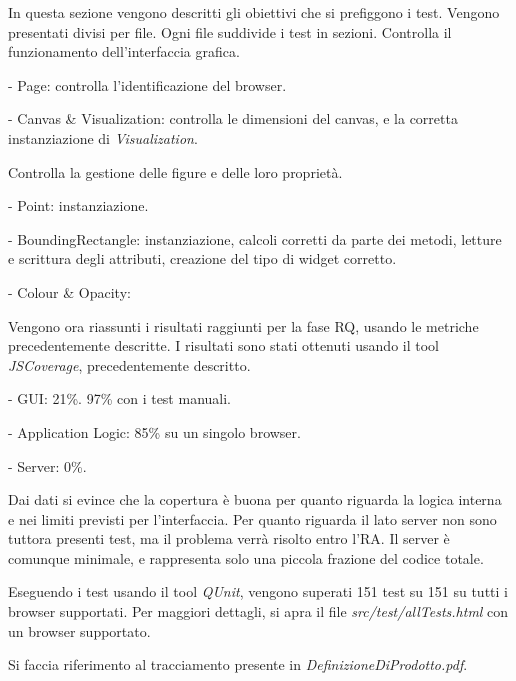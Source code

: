 In questa sezione vengono descritti gli obiettivi che si prefiggono i test. Vengono presentati divisi per file. Ogni file suddivide i test in sezioni.
Controlla il funzionamento dell'interfaccia grafica.
\begin{elencopuntato}[\subsubsecindent]
\item[-] Page: controlla l'identificazione del browser.
\item[-] Canvas & Visualization: controlla le dimensioni del canvas, e la corretta instanziazione di \textit{Visualization}.
\end{elencopuntato}
Controlla la gestione delle figure e delle loro propriet\`a.
\begin{elencopuntato}[\subsubsecindent]
\item[-] Point: instanziazione.
\item[-] BoundingRectangle: instanziazione, calcoli corretti da parte dei metodi, letture e scrittura degli attributi, creazione del tipo di widget corretto.
\item[-] Colour & Opacity:
\end{elencopuntato}


Vengono ora riassunti i risultati raggiunti per la fase RQ, usando le metriche precedentemente descritte.
I risultati sono stati ottenuti usando il tool \textit{JSCoverage}, precedentemente descritto.
\begin{elencopuntato}[\subsubsecindent]
\item[-] GUI: 21\%. 97\% con i test manuali.
\item[-] Application Logic: 85\% su un singolo browser.
\item[-] Server: 0\%.
\end{elencopuntato}
Dai dati si evince che la copertura \`e buona per quanto riguarda la logica interna e nei limiti previsti per l'interfaccia. Per quanto riguarda il lato server non sono tuttora presenti test, ma il problema verr\`a risolto entro l'RA. Il server \`e comunque minimale, e rappresenta solo una piccola frazione del codice totale.

Eseguendo i test usando il tool \textit{QUnit}, vengono superati 151 test su 151 su tutti i browser supportati. Per maggiori dettagli, si apra il file \textit{src/test/allTests.html} con un browser supportato.

Si faccia riferimento al tracciamento presente in \textit{DefinizioneDiProdotto.pdf}.

